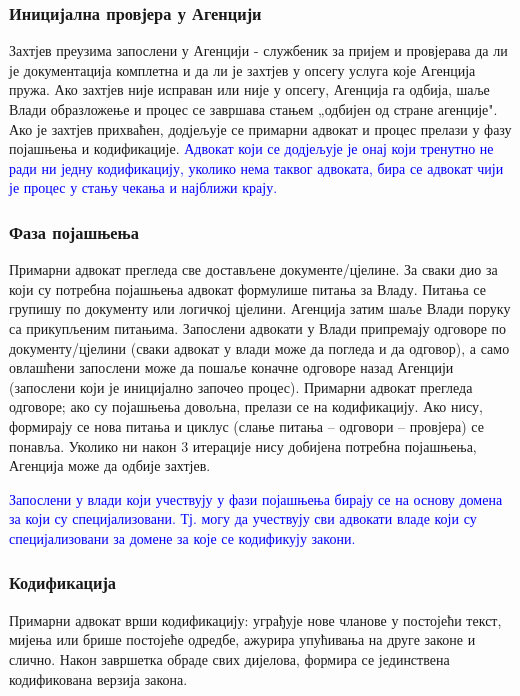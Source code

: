 \documentclass[12pt,a4paper]{article}
\newcommand{\optional}[1]{\textcolor{blue}{#1}}
\begin{document}
\subsubsection{Иницијална провјера у Агенцији}

Захтјев преузима запослени у Агенцији - службеник за пријем и провјерава да ли је документација комплетна и да ли је захтјев у опсегу услуга које Агенција пружа. Ако захтјев није исправан или није у опсегу, Агенција га одбија, шаље Влади образложење и процес се завршава стањем „одбијен од стране агенције". Ако је захтјев прихваћен, додјељује се примарни адвокат и процес прелази у фазу појашњења и кодификације. \optional{Адвокат који се додјељује је онај који тренутно не ради ни једну кодификацију, уколико нема таквог адвоката, бира се адвокат чији је процес у стању чекања и најближи крају.}

\subsubsection{Фаза појашњења}

Примарни адвокат прегледа све достављене документе/цјелине. За сваки дио за који су потребна појашњења адвокат формулише питања за Владу. Питања се групишу по документу или логичкој цјелини. Агенција затим шаље Влади поруку са прикупљеним питањима. Запослени адвокати у Влади припремају одговоре по документу/цјелини (сваки адвокат у влади може да погледа и да одговор), а само овлашћени запослени може да пошаље коначне одговоре назад Агенцији (запослени који је иницијално започео процес). Примарни адвокат прегледа одговоре; ако су појашњења довољна, прелази се на кодификацију. Ако нису, формирају се нова питања и циклус (слање питања – одговори – провјера) се понавља. Уколико ни након 3 итерације нису добијена потребна појашњења, Агенција може да одбије захтјев.

\optional{Запослени у влади који учествују у фази појашњења бирају се на основу домена за који су специјализовани. Тј. могу да учествују сви адвокати владе који су специјализовани за домене за које се кодификују закони.}

\subsubsection{Кодификација}

Примарни адвокат врши кодификацију: уграђује нове чланове у постојећи текст, мијења или брише постојеће одредбе, ажурира упућивања на друге законе и слично. Након завршетка обраде свих дијелова, формира се јединствена кодификована верзија закона.
\end{document}
